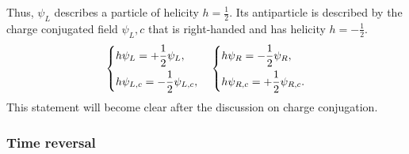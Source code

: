 Thus, \(\psi_L\) describes a particle of helicity \(h=\tfrac12\). Its antiparticle is described by the charge conjugated field \(\psi_L,c\) that is right-handed and has helicity \(h=-\tfrac12\).
\[
    \begin{dcases}
        h \psi_L = +\frac{1}{2} \psi_L, \\
        h \psi_{L,c} = -\frac{1}{2} \psi_{L,c},
    \end{dcases} \quad \begin{dcases}
        h \psi_R = -\frac{1}{2} \psi_R, \\
        h \psi_{R,c} = +\frac{1}{2} \psi_{R,c}.
    \end{dcases}
\]
This statement will become clear after the discussion on charge conjugation.

\subsubsection{Time reversal}

